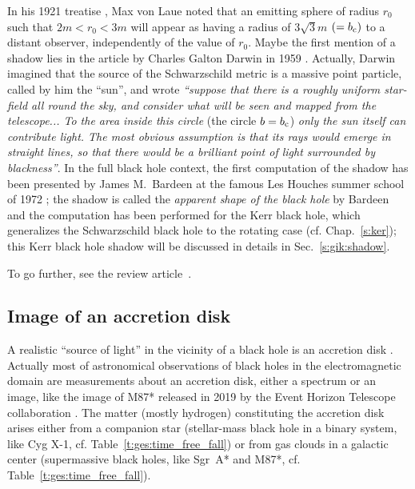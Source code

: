 \begin{hist} \label{h:gis:bh_shadow}
In his 1921 treatise \cite{Laue1921}, Max von Laue
noted that an emitting sphere of radius $r_0$ such that $2m < r_0 < 3m$ will
appear as having a radius of $3\sqrt{3} m$ $(=b_{\rm c})$ to a distant observer,
independently of the value of $r_0$.
Maybe the first mention of a shadow lies in the article by
Charles Galton Darwin in 1959 \cite{Darwi59}. Actually,
Darwin imagined that the source of the Schwarzschild metric is a massive
point particle, called by him the ``sun'', and wrote
\emph{``suppose that there is a roughly uniform star-field all round the sky, and
consider what will be seen and mapped from the telescope... To the area inside
this circle} (the circle $b=b_{\rm c}$) \emph{only the sun itself can contribute light. The most obvious assumption is
that its rays would emerge in straight lines, so that there would be a brilliant point of
light surrounded by blackness''}. In the full black hole context, the first
computation of the shadow has been presented by James M.~Bardeen
at the famous Les Houches summer school of
1972 \cite{Barde73}; the shadow is called the \emph{apparent shape of the black hole}
by Bardeen and the computation has been performed for the Kerr black hole,
which generalizes the Schwarzschild black hole to the rotating case (cf. Chap.~\ref{s:ker}); this
Kerr black hole shadow will be discussed in details in Sec.~\ref{s:gik:shadow}.
\end{hist}

To go further, see the review article~\cite{CunhaH18}.

\subsection{Image of an accretion disk} \label{s:gis:image_disk}

A realistic ``source of light'' in the vicinity of a black hole is an
accretion disk \cite{AbramF13}. Actually most of astronomical
observations of black holes in the electromagnetic domain are measurements
about an accretion disk, either a spectrum or an image, like the image
of M87* released in 2019 by the Event Horizon Telescope collaboration
\cite{EHT19a}. The matter (mostly hydrogen) constituting the accretion disk
arises either from a companion star (stellar-mass black hole in a binary
system, like Cyg X-1, cf. Table~\ref{t:ges:time_free_fall})
or from gas clouds in a galactic center (supermassive black holes, like
Sgr~A* and M87*, cf. Table~\ref{t:ges:time_free_fall}).

